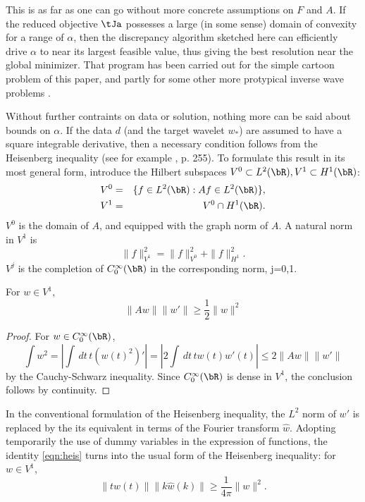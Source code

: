 This is as far as one can go without more concrete assumptions on $F$
and $A$. If the reduced
objective $\tJa$ possesses a large (in some sense) domain of convexity for a range of $\alpha$, then the discrepancy algorithm sketched
here can efficiently drive $\alpha$ to near its largest feasible
value, thus giving the best resolution near the global minimizer. That
program has been carried out for the simple cartoon problem of this
paper, and partly for some other more protypical inverse wave problems \cite[]{FuSymes2017discrep}.

Without further contraints on data or solution, nothing more can be
said about bounds on $\alpha$. If the data $d$ (and the target wavelet
$w_*$) are assumed to have a square integrable derivative, then a
necessary condition follows from the Heisenberg
inequality (see for example \cite{Folland:07}, p. 255). To formulate
this result in its most general form, introduce the Hilbert subspaces
$V^0 \subset L^2(\bR), V^1 \subset H^1(\bR)$:
\begin{eqnarray}
  V^0 & = & \{ f \in L^2(\bR): Af \in L^2(\bR)\}, \nonumber\\
  V^1 & = & V^0 \cap H^1(\bR).
            \label{eqn:vdef}
\end{eqnarray}
$V^0$ is the domain of $A$, and equipped with the graph norm of $A$. A
natural norm in $V^1$ is
\[
  \|f\|^2_{V^1} = \|f\|_{V^0}^2 + \|f\|_{H^1}^2.
\]
$V^j$ is the completion of $C_0^{\infty}(\bR)$ in the corresponding
norm, j=0,1.

\begin{proposition}
  \label{thm:heis}
For $w \in V^1$,
  \begin{equation}
    \label{eqn:heis}
    \|Aw\|\|w'\| \ge \frac{1}{2}\|w\|^2
  \end{equation}
\end{proposition}

\begin{proof}
  For $w \in C_0^{\infty}(\bR)$,
  \[
    \int w^2 = \left|\int\,dt\, t (w(t)^2)' \right|= \left|2\int\,dt\,tw(t)w'(t)\right| \le
    2\|Aw\| \|w'\|
  \]
  by the Cauchy-Schwarz inequality. Since $C_0^{\infty}(\bR)$ is dense
  in $V^1$, the conclusion follows by continuity.
\end{proof}

In the conventional formulation of the Heisenberg inequality, the $L^2$ norm of
$w'$ is replaced by the its equivalent in terms of the Fourier
transform $\hat{w}$. Adopting temporarily the use of dummy variables
in the expression of functions, the identity \ref{eqn:heis} turns into
the usual form of the Heisenberg inequality: for $w \in V^1$,
\begin{equation}
\label{eqn:fheis}
\|tw(t)\|\|k\hat{w}(k)\| \ge \frac{1}{4\pi}\|w\|^2.
\end{equation}

